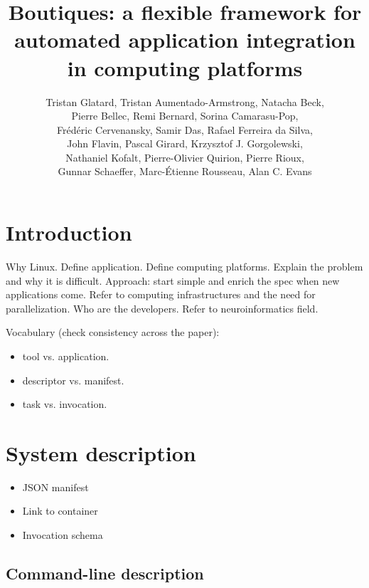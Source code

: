 \documentclass{article}
\title{Boutiques: a flexible framework for automated application integration in computing platforms}
\begin{document}
\author{Tristan Glatard, Tristan Aumentado-Armstrong, Natacha Beck, \\
  Pierre Bellec, Remi Bernard, Sorina Camarasu-Pop, \\
  Fr\'ed\'eric Cervenansky, Samir Das, Rafael Ferreira da Silva, \\ 
  John Flavin, Pascal Girard, Krzysztof J. Gorgolewski, \\
  Nathaniel Kofalt, Pierre-Olivier Quirion, Pierre Rioux, \\
  Gunnar Schaeffer, Marc-\'Etienne Rousseau, Alan C. Evans}

\maketitle

\section{Introduction}

Why Linux. Define application. Define computing platforms. Explain the
problem and why it is difficult. Approach: start simple and enrich the
spec when new applications come. Refer to computing infrastructures
and the need for parallelization. Who are
the developers. Refer to neuroinformatics field. 

Vocabulary (check consistency across the paper):
\begin{itemize}
\item tool vs. application.
\item descriptor vs. manifest.
\item task vs. invocation.
\end{itemize}

\section{System description}

\begin{itemize}
\item JSON manifest
\item Link to container
\item Invocation schema
\end{itemize}

\subsection{Command-line description}
\end{document}
